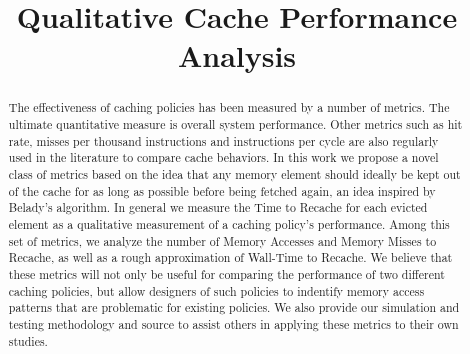 \documentclass[conference]{IEEEtran}
\begin{document}
\title{Qualitative Cache Performance Analysis}

\author{}

\maketitle

\begin{abstract}
The effectiveness of caching policies has been measured by a number of metrics. 
The ultimate quantitative measure is overall system performance.
Other metrics such as hit rate, misses per thousand instructions and
instructions per cycle are also regularly used in the literature to
compare cache behaviors.
In this work we propose a novel class of metrics based on the idea
that any memory element should ideally be kept out of the cache
for as long as possible before being fetched again, an idea inspired
by Belady's algorithm.
In general we measure the Time to Recache for each evicted element as a qualitative measurement of a caching policy's performance.
Among this set of metrics, we analyze the number of Memory Accesses and Memory Misses to Recache, as well as a rough approximation
of Wall-Time to Recache.
We believe that these metrics will not only be useful for comparing the performance of two different caching policies,
  but allow designers of such policies to indentify memory access
  patterns that are problematic for existing policies.
We also provide our simulation and testing methodology and source to
assist others in applying these metrics to their own
studies.
\end{abstract}











\end{document}
